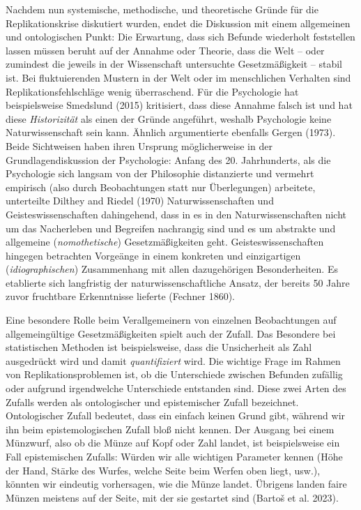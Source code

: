 \documentclass[
  letterpaper,
  DIV=11,
  numbers=noendperiod]{scrreprt}
\begin{document}
Nachdem nun systemische, methodische, und theoretische Gründe für die
Replikationskrise diskutiert wurden, endet die Diskussion mit einem
allgemeinen und ontologischen Punkt: Die Erwartung, dass sich Befunde
wiederholt feststellen lassen müssen beruht auf der Annahme oder
Theorie, dass die Welt -- oder zumindest die jeweils in der Wissenschaft
untersuchte Gesetzmäßigkeit -- stabil ist. Bei fluktuierenden Mustern in
der Welt oder im menschlichen Verhalten sind Replikationsfehlschläge
wenig überraschend. Für die Psychologie hat beispielsweise Smedslund
(2015) kritisiert, dass diese Annahme falsch ist und hat diese
\emph{Historizität} als einen der Gründe angeführt, weshalb Psychologie
keine Naturwissenschaft sein kann. Ähnlich argumentierte ebenfalls
Gergen (1973). Beide Sichtweisen haben ihren Ursprung möglicherweise in
der Grundlagendiskussion der Psychologie: Anfang des 20. Jahrhunderts,
als die Psychologie sich langsam von der Philosophie distanzierte und
vermehrt empirisch (also durch Beobachtungen statt nur Überlegungen)
arbeitete, unterteilte Dilthey and Riedel (1970) Naturwissenschaften und
Geisteswissenschaften dahingehend, dass in es in den Naturwissenschaften
nicht um das Nacherleben und Begreifen nachrangig sind und es um
abstrakte und allgemeine (\emph{nomothetische}) Gesetzmäßigkeiten geht.
Geisteswissenschaften hingegen betrachten Vorgeänge in einem konkreten
und einzigartigen (\emph{idiographischen}) Zusammenhang mit allen
dazugehörigen Besonderheiten. Es etablierte sich langfristig der
naturwissenschaftliche Ansatz, der bereits 50 Jahre zuvor fruchtbare
Erkenntnisse lieferte (Fechner 1860).

Eine besondere Rolle beim Verallgemeinern von einzelnen Beobachtungen
auf allgemeingültige Gesetzmäßigkeiten spielt auch der Zufall. Das
Besondere bei statistischen Methoden ist beispielsweise, dass die
Unsicherheit als Zahl ausgedrückt wird und damit \emph{quantifiziert}
wird. Die wichtige Frage im Rahmen von Replikationsproblemen ist, ob die
Unterschiede zwischen Befunden zufällig oder aufgrund irgendwelche
Unterschiede entstanden sind. Diese zwei Arten des Zufalls werden als
ontologischer und epistemischer Zufall bezeichnet. Ontologischer Zufall
bedeutet, dass ein einfach keinen Grund gibt, während wir ihn beim
epistemologischen Zufall bloß nicht kennen. Der Ausgang bei einem
Münzwurf, also ob die Münze auf Kopf oder Zahl landet, ist
beispielsweise ein Fall epistemischen Zufalls: Würden wir alle wichtigen
Parameter kennen (Höhe der Hand, Stärke des Wurfes, welche Seite beim
Werfen oben liegt, usw.), könnten wir eindeutig vorhersagen, wie die
Münze landet. Übrigens landen faire Münzen meistens auf der Seite, mit
der sie gestartet sind (Bartoš et al. 2023).
\end{document}
